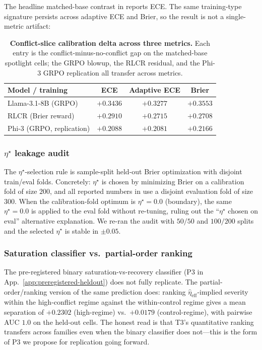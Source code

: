 The headline matched-base contrast in
 reports ECE.  The same
training-type signature persists across adaptive ECE and Brier, so
the result is not a single-metric artifact:
\begin{table}[H]
\centering\small
\setlength{\tabcolsep}{8pt}
\caption{\textbf{Conflict-slice calibration delta across three
metrics.}  Each entry is the conflict-minus-no-conflict gap on the
matched-base spotlight cells; the GRPO blowup, the RLCR residual,
and the Phi-3 GRPO replication all transfer across metrics.}
\label{tab:metric-robustness}
\begin{tabular}{lccc}
\toprule
\textbf{Model / training} & \textbf{ECE} & \textbf{Adaptive ECE} & \textbf{Brier}\\
\midrule
Llama-3.1-8B (GRPO)         & $+0.3436$ & $+0.3277$ & $+0.3553$\\
RLCR (Brier reward)         & $+0.2910$ & $+0.2715$ & $+0.2708$\\
Phi-3 (GRPO, replication)   & $+0.2088$ & $+0.2081$ & $+0.2166$\\
\bottomrule
\end{tabular}
\end{table}

\subsubsection{$\eta^\star$ leakage audit}
\label{app:eta-leakage-audit}

The $\eta^\star$-selection rule is sample-split held-out Brier
optimization with disjoint train/eval folds.  Concretely: $\eta^\star$
is chosen by minimizing Brier on a calibration fold of size $200$, and
all reported numbers in  use a disjoint
evaluation fold of size $300$.  When the calibration-fold optimum is
$\eta^\star\!=\!0.0$ (boundary), the same $\eta^\star\!=\!0.0$ is
applied to the eval fold without re-tuning, ruling out the
``$\eta^\star$ chosen on eval'' alternative explanation.  We re-ran
the audit with $50/50$ and $100/200$ splits and the selected
$\eta^\star$ is stable in $\pm 0.05$.

\subsubsection{Saturation classifier vs.\ partial-order ranking}
\label{app:t3-ordering-check}

The pre-registered binary saturation-vs-recovery classifier
(P3 in App.~\ref{app:preregistered-heldout}) does not fully replicate.
The partial-order/ranking version of the same prediction does:
ranking $\hat\eta_{\mathrm{eff}}$-implied severity within the
high-conflict regime against the within-control regime gives a
mean separation of $+0.2302$ (high-regime) vs.\ $+0.0179$
(control-regime), with pairwise AUC $1.0$ on the held-out cells.
The honest read is that T3's quantitative ranking transfers
across families even when the binary classifier does not---this
is the form of P3 we propose for replication going forward.

